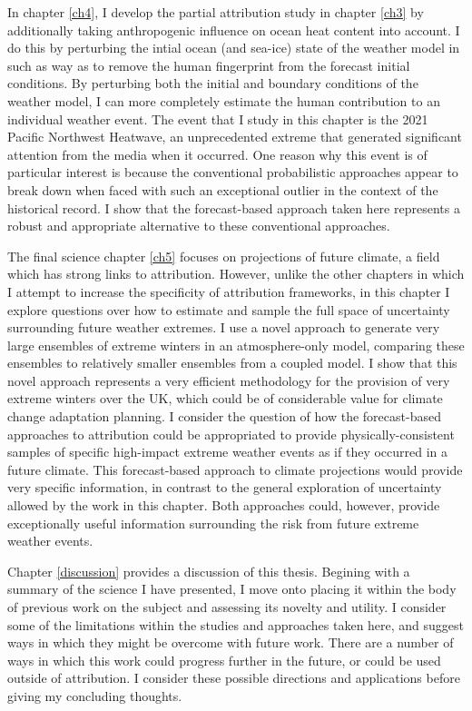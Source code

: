   In chapter \ref{ch4}, I develop the partial attribution study in chapter \ref{ch3} by additionally taking anthropogenic influence on ocean heat content into account. I do this by perturbing the intial ocean (and sea-ice) state of the weather model in such as way as to remove the human fingerprint from the forecast initial conditions. By perturbing both the initial and boundary conditions of the weather model, I can more completely estimate the human contribution to an individual weather event. The event that I study in this chapter is the 2021 Pacific Northwest Heatwave, an unprecedented extreme that generated significant attention from the media when it occurred. One reason why this event is of particular interest is because the conventional probabilistic approaches appear to break down when faced with such an exceptional outlier in the context of the historical record. I show that the forecast-based approach taken here represents a robust and appropriate alternative to these conventional approaches.

  The final science chapter \ref{ch5} focuses on projections of future climate, a field which has strong links to attribution. However, unlike the other chapters in which I attempt to increase the specificity of attribution frameworks, in this chapter I explore questions over how to estimate and sample the full space of uncertainty surrounding future weather extremes. I use a novel approach to generate very large ensembles of extreme winters in an atmosphere-only model, comparing these ensembles to relatively smaller ensembles from a coupled model. I show that this novel approach represents a very efficient methodology for the provision of very extreme winters over the UK, which could be of considerable value for climate change adaptation planning. I consider the question of how the forecast-based approaches to attribution could be appropriated to provide physically-consistent samples of specific high-impact extreme weather events as if they occurred in a future climate. This forecast-based approach to climate projections would provide very specific information, in contrast to the general exploration of uncertainty allowed by the work in this chapter. Both approaches could, however, provide exceptionally useful information surrounding the risk from future extreme weather events.

  Chapter \ref{discussion} provides a discussion of this thesis. Begining with a summary of the science I have presented, I move onto placing it within the body of previous work on the subject and assessing its novelty and utility. I consider some of the limitations within the studies and approaches taken here, and suggest ways in which they might be overcome with future work. There are a number of ways in which this work could progress further in the future, or could be used outside of attribution. I consider these possible directions and applications before giving my concluding thoughts.
